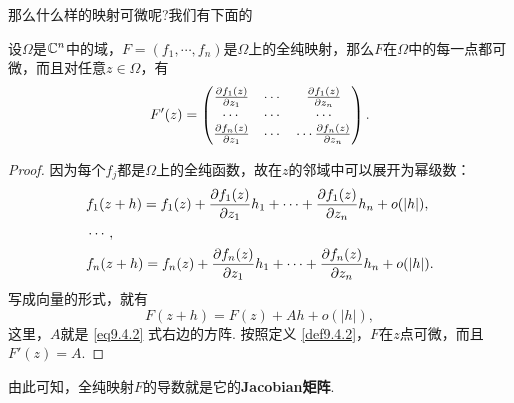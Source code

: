 那么什么样的映射可微呢?我们有下面的
\begin{theorem}\label{thm9.4.3}
设$\Omega$是$\mathbb C^n$中的域，$F=(f_1,\cdots,f_n)$是$\Omega$上的全纯映射，那么$F$在$\Omega$中的每一点都可微，而且对任意$z\in\Omega$，有
\begin{equation}\label{eq9.4.2}
F'(z)=\begin{pmatrix}
\frac{\partial f_1(z)}{\partial z_1}&\cdots&\frac{\partial f_1(z)}{\partial z_n}\\
\cdots&\cdots&\cdots\\
\frac{\partial f_n(z)}{\partial z_1}&\cdots&\cdots\frac{\partial f_n(z)}{\partial z_n}
\end{pmatrix}.
\end{equation}
\end{theorem}
\begin{proof}
因为每个$f_j$都是$\Omega$上的全纯函数，故在$z$的邻域中可以展开为幂级数：
\begin{align*}
&f_1(z+h)=f_1(z)+\frac{\partial f_1(z)}{\partial z_1}h_1+\cdots+\frac{\partial f_1(z)}{\partial z_n}h_n+o(|h|),\\
&\cdots,\\
&f_n(z+h)=f_n(z)+\frac{\partial f_n(z)}{\partial z_1}h_1+\cdots+\frac{\partial f_n(z)}{\partial z_n}h_n+o(|h|).
\end{align*}
写成向量的形式，就有
\[F(z+h)=F(z)+Ah+o(|h|),\]
这里，$A$就是 \eqref{eq9.4.2} 式右边的方阵. 按照定义 \ref{def9.4.2}，$F$在$z$点可微，而且$F'(z)=A$.
\end{proof}

由此可知，全纯映射$F$的导数就是它的\textbf{Jacobian矩阵}.


